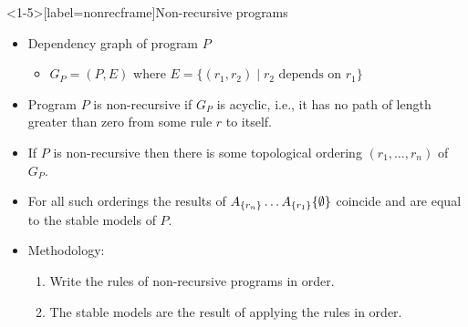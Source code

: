 \begin{frame}<1-5>[label=nonrecframe]{Non-recursive programs}
  \begin{itemize}
      \item \alert<1>{Dependency graph} of program $P$
      \begin{itemize}
        \item $G_P=(P,E)$ where $E=\{ (r_1,r_2) \mid r_2 \mbox{ depends on } r_1 \}$
      \end{itemize}
    \pause
    \item Program $P$ is \alert<2>{non-recursive} if $G_P$ is acyclic, i.e., it has no path of length greater than zero
          from some rule $r$ to itself.
    \pause
    \bigskip
    \item If $P$ is \alert<3>{non-recursive} then there is some \alert<3>{topological ordering}
          $(r_1, \ldots, r_n)$
          of $G_P$. %
    \pause
    \item For all such orderings the results of
          \alert<4>{$A_{\{r_n\}}\ldots A_{\{r_1\}}\{\emptyset\}$}
          coincide and are equal to the \alert<4>{stable models} of $P$.
    \pause
    \bigskip
    \item \alert<5>{Methodology:} 
          \begin{enumerate}
            \item Write the rules of non-recursive programs in order.
            \item The stable models are the result of applying the rules in order.
          \end{enumerate}
  \end{itemize}
\end{frame}


